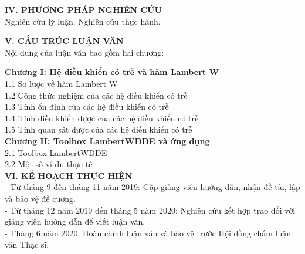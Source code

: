 \documentclass[12pt,oneside,portrait,a4paper]{book}
\theoremstyle{definition}
\theoremstyle{plain}
\begin{document}
\vspace{6pt}
\noindent 
\textbf{ IV. PHƯƠNG PHÁP NGHIÊN CỨU}\\
\hspace*{0,5cm} Nghiên cứu lý luận. Nghiên cứu thực hành.

\vspace{6pt}
\noindent 
\textbf{ V. CẤU TRÚC LUẬN VĂN}\\
\hspace*{1cm} Nội dung của luận văn bao gồm hai chương:


\hspace*{0,5cm}\textbf{Chương I: Hệ điều khiển có trễ và hàm Lambert W}\\
\hspace*{1cm} 1.1 Sơ lược về hàm Lambert W \\
\hspace*{1cm} 1.2 Công thức nghiệm của các hệ điều khiển có trễ \\
\hspace*{1cm} 1.3 Tính ổn định của các hệ điều khiển có trễ \\
\hspace*{1cm} 1.4 Tính điều khiển được của các hệ điều khiển có trễ \\
\hspace*{1cm} 1.5 Tính quan sát được của các hệ điều khiển có trễ \\

\vskip 0.5cm 
\hspace*{0,5cm}\textbf{Chương II: Toolbox LambertWDDE và ứng dụng}\\
\hspace*{1cm} 2.1 Toolbox LambertWDDE \\
\hspace*{1cm} 2.2 Một số ví dụ thực tế \\

\vspace{6pt}
\noindent 
\textbf{ VI. KẾ HOẠCH THỰC HIỆN}\\
\hspace*{1cm} - Từ tháng 9 đến tháng 11 năm 2019: Gặp giảng viên hướng dẫn, nhận đề tài, lập và bảo vệ đề cương.\\
\hspace*{1cm} - Từ tháng 12 năm 2019 đến tháng 5 năm 2020: Nghiên cứu kết hợp trao đổi với giảng viên hướng dẫn để viết luận văn.\\
\hspace*{1cm} - Tháng 6 năm 2020: Hoàn chỉnh luận văn và bảo vệ trước Hội đồng chấm luận văn Thạc sĩ.\\
\end{document}
